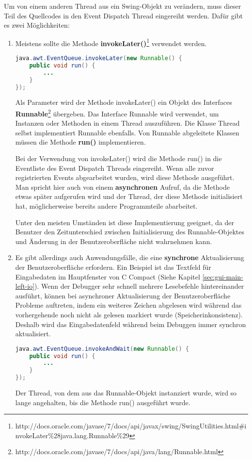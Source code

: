 \begin{enumerate}
Um von einem anderen Thread aus ein Swing-Objekt zu verändern, muss dieser Teil des Quellcodes in den Event Dispatch Thread eingereiht werden. Dafür gibt es zwei Möglichkeiten:
\begin{enumerate}
\item Meistens sollte die Methode \textbf{invokeLater()}\footnote{http://docs.oracle.com/javase/7/docs/api/javax/swing/SwingUtilities.html\#invokeLater\%28java.lang.Runnable\%29} verwendet werden.
\begin{lstlisting}[language=JAVA]
java.awt.EventQueue.invokeLater(new Runnable() {
	public void run() {
		...
	}
});
\end{lstlisting}
	Als Parameter wird der Methode invokeLater() ein Objekt des Interfaces \textbf{Runnable}\footnote{http://docs.oracle.com/javase/7/docs/api/java/lang/Runnable.html} übergeben. Das Interface Runnable wird verwendet, um Instanzen oder Methoden in einem Thread auszuführen. Die Klasse Thread selbst implementiert Runnable ebenfalls. Von Runnable abgeleitete Klassen müssen die Methode \textbf{run()} implementieren.
	
	Bei der Verwendung von invokeLater() wird die Methode run() in die Eventliste des Event Dispatch Threads eingereiht. Wenn alle zuvor registrierten Events abgearbeitet wurden, wird diese Methode ausgeführt. Man spricht hier auch von einem \textbf{asynchronen} Aufruf, da die Methode etwas später aufgerufen wird und der Thread, der diese Methode initialisiert hat, möglicherweise bereits andere Programmteile abarbeitet.
	
	Unter den meisten Umständen ist diese Implementierung geeignet, da der Benutzer den Zeitunterschied zwischen Initialisierung des Runnable-Objektes und Änderung in der Benutzeroberfläche nicht wahrnehmen kann. 
	
\item Es gibt allerdings auch Anwendungsfälle, die eine \textbf{synchrone} Aktualisierung der Benutzeroberfläche erfordern. Ein Beispiel ist das Textfeld für Eingabedaten im Hauptfenster von C Compact (Siehe Kapitel \ref{sec:gui-main-left-io}). Wenn der Debugger sehr schnell mehrere Lesebefehle hintereinander ausführt, können bei asynchroner Aktualisierung der Benutzeroberfläche Probleme auftreten, indem ein weiteres Zeichen abgelesen wird während das vorhergehende noch nicht als gelesen markiert wurde (Speicherinkonsistenz). Deshalb wird das Eingabedatenfeld während beim Debuggen immer synchron aktualisiert.
\begin{lstlisting}[language=JAVA]
java.awt.EventQueue.invokeAndWait(new Runnable() {
	public void run() {
		...
	}
});
\end{lstlisting}
	Der Thread, von dem aus das Runnable-Objekt instanziert wurde, wird so lange angehalten, bis die Methode run() ausgeführt wurde.


\end{enumerate}
\end{enumerate}
